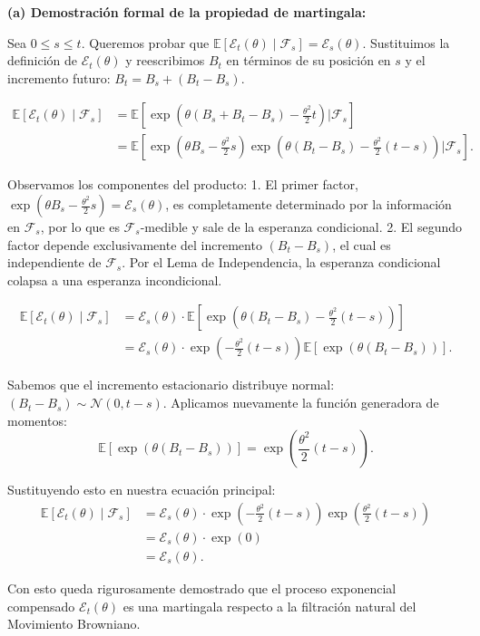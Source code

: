 \documentclass[11pt, letterpaper]{article}
\begin{document}
\begin{solucion}
    \vspace{3mm}
    \textbf{(a) Demostración formal de la propiedad de martingala:}

    Sea $0 \le s \le t$. Queremos probar que $\mathbb{E}[\mathcal{E}_t(\theta) \mid \mathcal{F}_s] = \mathcal{E}_s(\theta)$.
    Sustituimos la definición de $\mathcal{E}_t(\theta)$ y reescribimos $B_t$ en términos de su posición en $s$ y el incremento futuro: $B_t = B_s + (B_t - B_s)$.
    
    \begin{align*}
        \mathbb{E}[\mathcal{E}_t(\theta) \mid \mathcal{F}_s] &= \mathbb{E}\left[ \exp\left( \theta(B_s + B_t - B_s) - \frac{\theta^2}{2}t \right) \mathrel{\Bigg|} \mathcal{F}_s \right] \\
        &= \mathbb{E}\left[ \exp\left( \theta B_s - \frac{\theta^2}{2}s \right) \exp\left( \theta(B_t - B_s) - \frac{\theta^2}{2}(t - s) \right) \mathrel{\Bigg|} \mathcal{F}_s \right].
    \end{align*}
    
    Observamos los componentes del producto:
    1. El primer factor, $\exp\left( \theta B_s - \frac{\theta^2}{2}s \right) = \mathcal{E}_s(\theta)$, es completamente determinado por la información en $\mathcal{F}_s$, por lo que es $\mathcal{F}_s$-medible y sale de la esperanza condicional.
    2. El segundo factor depende exclusivamente del incremento $(B_t - B_s)$, el cual es independiente de $\mathcal{F}_s$. Por el Lema de Independencia, la esperanza condicional colapsa a una esperanza incondicional.

    \begin{align*}
        \mathbb{E}[\mathcal{E}_t(\theta) \mid \mathcal{F}_s] &= \mathcal{E}_s(\theta) \cdot \mathbb{E}\left[ \exp\left( \theta(B_t - B_s) - \frac{\theta^2}{2}(t - s) \right) \right] \\
        &= \mathcal{E}_s(\theta) \cdot \exp\left( -\frac{\theta^2}{2}(t - s) \right) \mathbb{E}[\exp(\theta(B_t - B_s))].
    \end{align*}

    Sabemos que el incremento estacionario distribuye normal: $(B_t - B_s) \sim \mathcal{N}(0, t-s)$. Aplicamos nuevamente la función generadora de momentos:
    \[ \mathbb{E}[\exp(\theta(B_t - B_s))] = \exp\left( \frac{\theta^2}{2}(t - s) \right). \]

    Sustituyendo esto en nuestra ecuación principal:
    \begin{align*}
        \mathbb{E}[\mathcal{E}_t(\theta) \mid \mathcal{F}_s] &= \mathcal{E}_s(\theta) \cdot \exp\left( -\frac{\theta^2}{2}(t - s) \right) \exp\left( \frac{\theta^2}{2}(t - s) \right) \\
        &= \mathcal{E}_s(\theta) \cdot \exp(0) \\
        &= \mathcal{E}_s(\theta).
    \end{align*}

    Con esto queda rigurosamente demostrado que el proceso exponencial compensado $\mathcal{E}_t(\theta)$ es una martingala respecto a la filtración natural del Movimiento Browniano.
\end{solucion}
\end{document}
